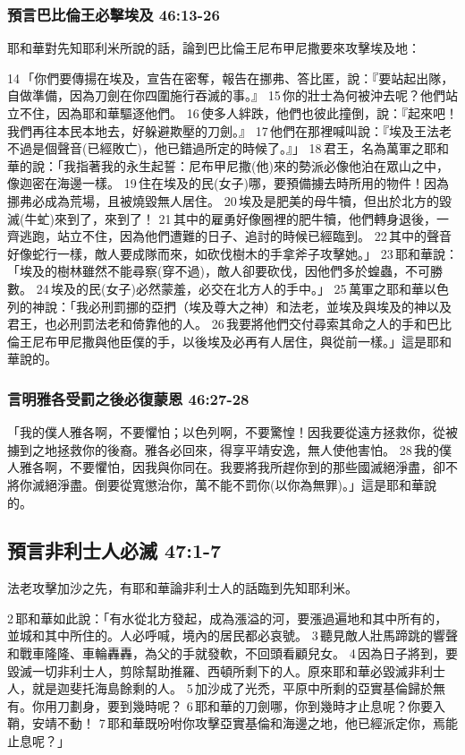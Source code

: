 \subsubsection{預言巴比倫王必擊埃及 46:13-26}
耶和華對先知耶利米所說的話，論到巴比倫王尼布甲尼撒要來攻擊埃及地：

14 「你們要傳揚在埃及，宣告在密奪，報告在挪弗、答比匿，說：『要站起出隊，自做準備，因為刀劍在你四圍施行吞滅的事。』 15 你的壯士為何被沖去呢？他們站立不住，因為耶和華驅逐他們。 16 使多人絆跌，他們也彼此撞倒，說：『起來吧！我們再往本民本地去，好躲避欺壓的刀劍。』 17 他們在那裡喊叫說：『埃及王法老不過是個聲音(已經敗亡)，他已錯過所定的時候了。』」 18 君王，名為萬軍之耶和華的說：「我指著我的永生起誓：尼布甲尼撒(他)來的勢派必像他泊在眾山之中，像迦密在海邊一樣。 19 住在埃及的民(女子)哪，要預備擄去時所用的物件！因為挪弗必成為荒場，且被燒毀無人居住。 20 埃及是肥美的母牛犢，但出於北方的毀滅(牛虻)來到了，來到了！ 21 其中的雇勇好像圈裡的肥牛犢，他們轉身退後，一齊逃跑，站立不住，因為他們遭難的日子、追討的時候已經臨到。 22 其中的聲音好像蛇行一樣，敵人要成隊而來，如砍伐樹木的手拿斧子攻擊她。」 23 耶和華說：「埃及的樹林雖然不能尋察(穿不過)，敵人卻要砍伐，因他們多於蝗蟲，不可勝數。 24 埃及的民(女子)必然蒙羞，必交在北方人的手中。」 25 萬軍之耶和華以色列的神說：「我必刑罰挪的亞捫（埃及尊大之神）和法老，並埃及與埃及的神以及君王，也必刑罰法老和倚靠他的人。 26 我要將他們交付尋索其命之人的手和巴比倫王尼布甲尼撒與他臣僕的手，以後埃及必再有人居住，與從前一樣。」這是耶和華說的。

\subsubsection{言明雅各受罰之後必復蒙恩 46:27-28}
「我的僕人雅各啊，不要懼怕；以色列啊，不要驚惶！因我要從遠方拯救你，從被擄到之地拯救你的後裔。雅各必回來，得享平靖安逸，無人使他害怕。 28 我的僕人雅各啊，不要懼怕，因我與你同在。我要將我所趕你到的那些國滅絕淨盡，卻不將你滅絕淨盡。倒要從寬懲治你，萬不能不罰你(以你為無罪)。」這是耶和華說的。

\subsection{預言非利士人必滅 47:1-7}
法老攻擊加沙之先，有耶和華論非利士人的話臨到先知耶利米。

2 耶和華如此說：「有水從北方發起，成為漲溢的河，要漲過遍地和其中所有的，並城和其中所住的。人必呼喊，境內的居民都必哀號。 3 聽見敵人壯馬蹄跳的響聲和戰車隆隆、車輪轟轟，為父的手就發軟，不回頭看顧兒女。 4 因為日子將到，要毀滅一切非利士人，剪除幫助推羅、西頓所剩下的人。原來耶和華必毀滅非利士人，就是迦斐托海島餘剩的人。 5 加沙成了光禿，平原中所剩的亞實基倫歸於無有。你用刀劃身，要到幾時呢？ 6 耶和華的刀劍哪，你到幾時才止息呢？你要入鞘，安靖不動！ 7 耶和華既吩咐你攻擊亞實基倫和海邊之地，他已經派定你，焉能止息呢？」

